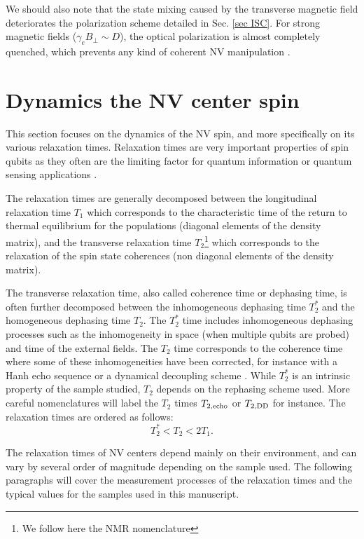 \documentclass[a4paper,11pt]{report}
\begin{document}
We should also note that the state mixing caused by the transverse magnetic field deteriorates the polarization scheme detailed in Sec. \ref{sec ISC}. For strong magnetic fields ($\gamma_e B_\perp \sim D$), the optical polarization is almost completely quenched, which prevents any kind of coherent NV manipulation \citep{tetienne2012magnetic}.

\section{Dynamics the NV center spin}

This section focuses on the dynamics of the NV spin, and more specifically on its various relaxation times. Relaxation times are very important properties of spin qubits as they often are the limiting factor for quantum information or quantum sensing applications \citep{de2021materials, degen2017quantum}.

The relaxation times are generally decomposed between the longitudinal relaxation time $T_1$ which corresponds to the characteristic time of the return to thermal equilibrium for the populations (diagonal elements of the density matrix), and the transverse relaxation time $T_2$\footnote{We follow here the NMR nomenclature} which corresponds to the relaxation of the spin state coherences (non diagonal elements of the density matrix).

The transverse relaxation time, also called coherence time or dephasing time, is often further decomposed between the inhomogeneous dephasing time $T_2^*$ and the homogeneous dephasing time $T_2$. The $T_2^*$ time includes inhomogeneous dephasing processes such as the inhomogeneity in space (when multiple qubits are probed) and time of the external fields. The $T_2$ time corresponds to the coherence time where some of these inhomogeneities have been corrected, for instance with a Hanh echo sequence \citep{hahn1950spin} or a dynamical decoupling scheme \citep{naydenov2011dynamical}. While $T_2^*$ is an intrinsic property of the sample studied, $T_2$ depends on the rephasing scheme used. More careful nomenclatures will label the $T_2$ times $T_{2,\rm echo}$ or $T_{2,\rm DD}$ \citep{de2021materials} for instance. The relaxation times are ordered as follows:
\begin{equation}
T_2^* < T_2 < 2 T_1.
\end{equation}

The relaxation times of NV centers depend mainly on their environment, and can vary by several order of magnitude depending on the sample used. The following paragraphs will cover the measurement processes of the relaxation times and the typical values for the samples used in this manuscript.
\end{document}
